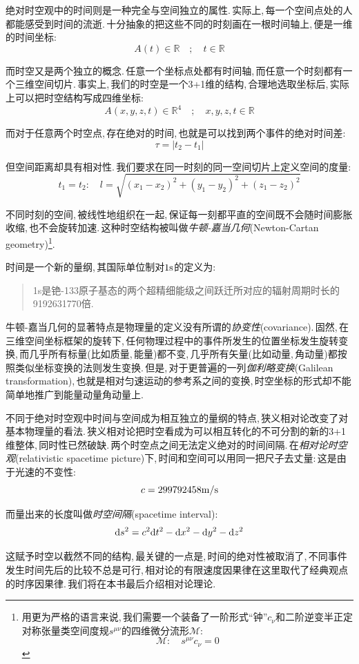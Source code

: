 绝对时空观中的时间则是一种完全与空间独立的属性.\,实际上,\,每一个空间点处的人都能感受到时间的流逝.\,十分抽象的把这些不同的时刻画在一根时间轴上,\,便是一维的时间坐标:
\[A(t)\in\mathbb{R} \quad;\quad t\in\mathbb{R}\]

而时空又是两个独立的概念.\,任意一个坐标点处都有时间轴,\,而任意一个时刻都有一个三维空间切片.\,事实上,\,我们的时空是一个3+1维的结构,\,合理地选取坐标后,\,实际上可以把时空结构写成四维坐标:
\[A(x,y,z,t)\in\mathbb{R}^4 \quad;\quad x,y,z,t\in\mathbb{R}\]

而对于任意两个时空点,\,存在绝对的时间,\,也就是可以找到两个事件的绝对时间差:
\[\tau=|t_2-t_1|\]

但空间距离却具有相对性.\,我们要求在同一时刻的同一空间切片上定义空间的度量:
\[t_1=t_2:\quad l=\sqrt{(x_1-x_2)^2+(y_1-y_2)^2+(z_1-z_2)^2}\]

不同时刻的空间,\,被线性地组织在一起,\,保证每一刻都平直的空间既不会随时间膨胀收缩,\,也不会旋转加速.\,这种时空结构被叫做\emph{牛顿-嘉当几何}(Newton-Cartan geometry)\footnote{用更为严格的语言来说,\,我们需要一个装备了一阶形式``钟''$c_\nu$和二阶逆变半正定对称张量类空间度规$s^{\mu\nu}$的四维微分流形$\mathscr{M}$:
\[\mathscr{M}:\quad s^{\mu\nu}c_{\nu}=0\]}.

时间是一个新的量纲,\,其国际单位制对$1{\rm s}$的定义为:
\begin{verse}
1s是铯-133原子基态的两个超精细能级之间跃迁所对应的辐射周期时长的9192631770倍.
\end{verse}

牛顿-嘉当几何的显著特点是物理量的定义没有所谓的\emph{协变性}(covariance).\,固然,\,在三维空间坐标框架的旋转下,\,任何物理过程中的事件所发生的位置坐标发生旋转变换,\,而几乎所有标量(比如质量,\,能量)都不变,\,几乎所有矢量(比如动量,\,角动量)都按照类似坐标变换的法则发生变换.\,但是,\,对于更普遍的一列\emph{伽利略变换}(Galilean transformation),\,也就是相对匀速运动的参考系之间的变换,\,时空坐标的形式却不能简单地推广到能量动量角动量上.

不同于绝对时空观中时间与空间成为相互独立的量纲的特点,\,狭义相对论改变了对基本物理量的看法.\,狭义相对论把时空看成为可以相互转化的不可分割的新的3+1维整体,\,同时性已然破缺.\,两个时空点之间无法定义绝对的时间间隔.\,在\emph{相对论时空观}(relativistic spacetime picture)下,\,时间和空间可以用同一把尺子去丈量:\,这是由于光速的不变性:
\[c=299792458{\rm m/s}\]

而量出来的长度叫做\emph{时空间隔}(spacetime interval):
\[\textrm{d} s^2=c^2\textrm{d} t^2-\textrm{d} x^2-\textrm{d} y^2-\textrm{d} z^2\]

这赋予时空以截然不同的结构,\,最关键的一点是,\,时间的绝对性被取消了,\,不同事件发生时间先后的比较不总是可行,\,相对论的有限速度因果律在这里取代了经典观点的时序因果律.\,我们将在本书最后介绍相对论理论.


